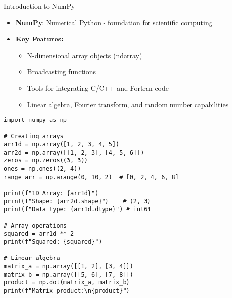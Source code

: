 \begin{frame}[fragile]{Introduction to NumPy}
    \begin{itemize}
        \item \textbf{NumPy}: Numerical Python - foundation for scientific computing
        \item \textbf{Key Features:}
        \begin{itemize}
            \item N-dimensional array objects (ndarray)
            \item Broadcasting functions
            \item Tools for integrating C/C++ and Fortran code
            \item Linear algebra, Fourier transform, and random number capabilities
        \end{itemize}
    \end{itemize}
    
    \begin{codeblock}
        \begin{lstlisting}
import numpy as np

# Creating arrays
arr1d = np.array([1, 2, 3, 4, 5])
arr2d = np.array([[1, 2, 3], [4, 5, 6]])
zeros = np.zeros((3, 3))
ones = np.ones((2, 4))
range_arr = np.arange(0, 10, 2)  # [0, 2, 4, 6, 8]

print(f"1D Array: {arr1d}")
print(f"Shape: {arr2d.shape}")    # (2, 3)
print(f"Data type: {arr1d.dtype}") # int64

# Array operations
squared = arr1d ** 2
print(f"Squared: {squared}")

# Linear algebra
matrix_a = np.array([[1, 2], [3, 4]])
matrix_b = np.array([[5, 6], [7, 8]])
product = np.dot(matrix_a, matrix_b)
print(f"Matrix product:\n{product}")
        \end{lstlisting}
    \end{codeblock}
\end{frame}

